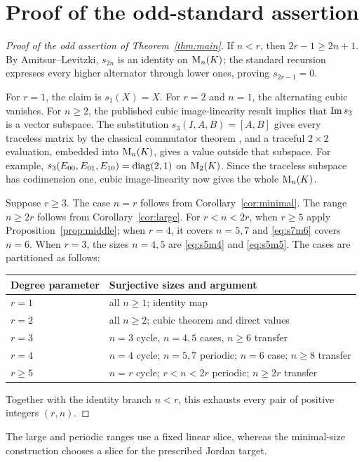 \section{Proof of the odd-standard assertion}\label{sec:assembly}
\begin{proof}[Proof of the odd assertion of Theorem~\ref{thm:main}]
If $n<r$, then $2r-1\ge2n+1$. By Amitsur--Levitzki,
$s_{2n}$ is an identity on $\mathrm{M}_n(K)$; the standard recursion
expresses every higher alternator through lower ones, proving
$s_{2r-1}=0$.

For $r=1$, the claim is $s_1(X)=X$. For $r=2$ and $n=1$,
the alternating cubic vanishes. For $n\ge2$, the published
cubic image-linearity result \cite[Theorem~3.5]{Vitas2026}
implies that $\operatorname{Im} s_3$ is a vector subspace. The substitution
$s_3(I,A,B)=[A,B]$ gives every traceless matrix by the classical
commutator theorem \cite{AlbertMuckenhoupt1957}, and a traceful
$2\times2$ evaluation,
embedded into $\mathrm{M}_n(K)$, gives a value outside that subspace.
For example, $s_3(E_{00},E_{01},E_{10})=\operatorname{diag}(2,1)$
on $\mathrm{M}_2(K)$. Since the traceless subspace has codimension one, cubic
image-linearity now gives the whole $\mathrm{M}_n(K)$.

Suppose $r\ge3$. The case $n=r$ follows from
Corollary~\ref{cor:minimal}. The range $n\ge2r$ follows from
Corollary~\ref{cor:large}. For $r<n<2r$, when $r\ge5$ apply
Proposition~\ref{prop:middle}; when $r=4$, it covers $n=5,7$
and \eqref{eq:s7m6} covers $n=6$. When $r=3$, the sizes
$n=4,5$ are \eqref{eq:s5m4} and \eqref{eq:s5m5}.
The cases are partitioned as follows:
\begin{center}
\small
\begin{tabular}{@{}ll@{}}
\toprule
Degree parameter & Surjective sizes and argument \\
\midrule
$r=1$ & all $n\ge1$; identity map\\
$r=2$ & all $n\ge2$; cubic theorem and direct values\\
$r=3$ & $n=3$ cycle, $n=4,5$ cases, $n\ge6$ transfer\\
$r=4$ & $n=4$ cycle; $n=5,7$ periodic; $n=6$ case; $n\ge8$ transfer\\
$r\ge5$ & $n=r$ cycle; $r<n<2r$ periodic; $n\ge2r$ transfer\\
\bottomrule
\end{tabular}
\end{center}
Together with the identity branch $n<r$, this exhausts every
pair of positive integers $(r,n)$.
\end{proof}

\begin{remark}
The large and periodic ranges use a fixed linear slice, whereas the
minimal-size construction chooses a slice for the prescribed Jordan target.
\end{remark}

